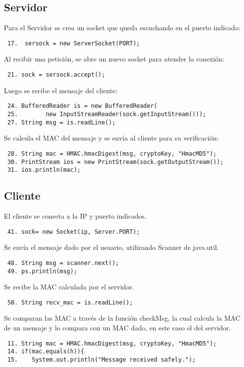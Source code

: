 \documentclass[letter, 10pt]{article}
\begin{document}
\subsection{Servidor}
Para el Servidor se crea un socket que queda escuchando en el puerto indicado:
\begin{verbatim}
 17.  sersock = new ServerSocket(PORT);
\end{verbatim}
Al recibir una petición, se abre un nuevo socket para atender la conexión:
\begin{verbatim}
 21. sock = sersock.accept();
\end{verbatim}
Luego se recibe el mensaje del cliente:
\begin{verbatim}
 24. BufferedReader is = new BufferedReader(
 25.        new InputStreamReader(sock.getInputStream()));
 27. String msg = is.readLine();
\end{verbatim}
Se calcula el MAC del mensaje y se envía al cliente para su verificación:
\begin{verbatim}
 28. String mac = HMAC.hmacDigest(msg, cryptoKey, "HmacMD5"); 
 30. PrintStream ios = new PrintStream(sock.getOutputStream());
 31. ios.println(mac);
\end{verbatim}

\subsection{Cliente}
El cliente se conecta a la IP y puerto indicados.
\begin{verbatim}
 41. sock= new Socket(ip, Server.PORT);
\end{verbatim}
Se envía el mensaje dado por el usuario, utilizando Scanner de java.util.
\begin{verbatim}
 48. String msg = scanner.next(); 
 49. ps.println(msg); 
\end{verbatim}
Se recibe la MAC calculada por el servidor.
\begin{verbatim}
 50. String recv_mac = is.readLine();  
\end{verbatim}
Se comparan las MAC a través de la función checkMsg, la cual calcula la MAC de un mensaje
y lo compara con un MAC dado, en este caso el del servidor.
\begin{verbatim}
 11. String mac = HMAC.hmacDigest(msg, cryptoKey, "HmacMD5");
 14. if(mac.equals(h)){                                 
 15.    System.out.println("Message received safely.");
\end{verbatim}
\end{document}
